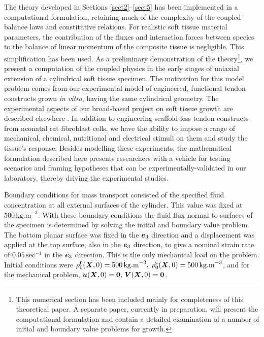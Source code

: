 The theory developed in Sections \ref{sect2}--\ref{sect5} has been
implemented in a computational formulation, retaining much of the
complexity of the coupled balance laws and constitutive relations.
For realistic soft tissue material parameters, the contribution of
the fluxes and interaction forces between species to the balance
of linear momentum of the composite tissue is negligible. This
simplification has been used. As a preliminary demonstration of
the theory\footnote{This numerical section has been included
mainly for completeness of this theoretical paper. A separate
paper, currently in preparation, will present the computational
formulation and contain a detailed examination of a number of
initial and boundary value problems for growth.}, we present a
computation of the coupled physics in the early stages of uniaxial
extension of a cylindrical soft tissue specimen. The motivation
for this model problem comes from our experimental model of
engineered, functional tendon constructs grown \emph{in vitro},
having the same cylindrical geometry. The experimental aspects of
our broad-based project on soft tissue growth are described
elsewhere \citep{Calve:04}. In addition to engineering
scaffold-less tendon constructs from neonatal rat fibroblast
cells, we have the ability to impose a range of mechanical,
chemical, nutritional and electrical stimuli on them and study the
tissue's response. Besides modelling these experiments, the
mathematical formulation described here presents researchers with
a vehicle for testing scenarios and framing hypotheses that can be
experimentally-validated in our laboratory, thereby driving the
experimental studies.


Boundary conditions for mass transport consisted of the specified
fluid concentration at all external surfaces of the cylinder. This
value was fixed at $500\,\mathrm{kg.m}^{-3}$. With these boundary
conditions the fluid flux normal to surfaces of the specimen is
determined by solving the initial and boundary value problem. The
bottom planar surface was fixed in the $\mbox{\boldmath$ e$}_3$ direction and a
displacement was applied at the top surface, also in the $\mbox{\boldmath$ e$}_3$
direction, to give a nominal strain rate of
$0.05\,\mathrm{sec}^{-1}$ in the $\mbox{\boldmath$ e$}_3$ direction. This is the
only mechanical load on the problem. Initial conditions were
$\rho_0^\mathrm{f}(\mbox{\boldmath$ X$},0) =
500\,\mathrm{kg.m}^{-3},\;\rho_0^\mathrm{s}(\mbox{\boldmath$ X$},0) =
500\,\mathrm{kg.m}^{-3}$, and for the mechanical problem,
$\mbox{\boldmath$ u$}(\mbox{\boldmath$ X$},0) = {\bf 0},\,\mbox{\boldmath$ V$}(\mbox{\boldmath$ X$},0) = {\bf 0}$.

